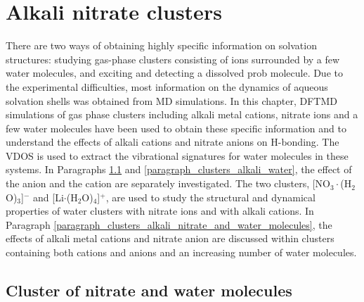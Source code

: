   \chapter{Alkali nitrate clusters}\label{CHAPTER_Clusters}
There are two ways of obtaining highly specific information on solvation structures: studying gas-phase clusters consisting of ions surrounded by a few water molecules\cite{Weber2000,Kropman2001},
and exciting and detecting a dissolved prob molecule\cite{Jimenez1994}.
Due to the experimental difficulties, most information on the dynamics of aqueous solvation shells was obtained from MD simulations\cite{Smith1994,Chandra2000}.
  In this chapter, DFTMD simulations of gas phase clusters including alkali metal cations, nitrate ions and a few water molecules have been used to obtain these specific information and to understand the
  effects of alkali cations and nitrate anions on H-bonding\cite{jiangling2010,heine2015}. 
  The VDOS is used to extract the vibrational signatures for water molecules in these systems.
  In Paragraphs \ref{paragraph_3w_nitrate} and \ref{paragraph_clusters_alkali_water}, 
  the effect of the anion and the cation are separately investigated. 
  The two clusters, [NO$_3\cdot$(H$_2$O)$_3$]$^-$ and [Li$\cdot$(H$_2$O)$_4$]$^+$, are used 
  to study the structural and dynamical properties of water clusters with nitrate ions and with alkali cations. 
  In Paragraph \ref{paragraph_clusters_alkali_nitrate_and_water_molecules}, the effects of alkali metal cations 
  and nitrate anion are discussed within clusters containing both cations and anions and an increasing number of water molecules.
  \section{Cluster of nitrate and water molecules}\label{paragraph_3w_nitrate}
  

